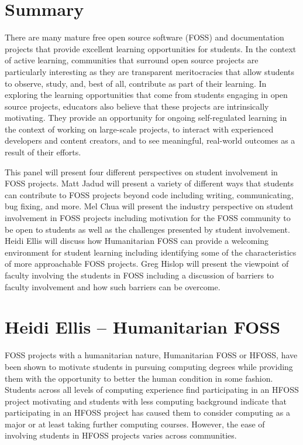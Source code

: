 \documentclass{sig-alt-release2}
\begin{document}

\section{Summary}
There are many mature free open source software (FOSS) and documentation projects that provide excellent learning opportunities for students.  In the context of active learning, communities that surround open source projects are particularly interesting as they are transparent meritocracies that allow students to observe, study, and, best of all, contribute as part of their learning.  In exploring the learning opportunities that come from students engaging in open source projects, educators also believe that these projects are intrinsically motivating. They provide an opportunity for ongoing self-regulated learning in the context of working on large-scale projects, to interact with experienced developers and content creators, and to see meaningful, real-world outcomes as a result of their efforts.

This panel will present four different perspectives on student involvement in FOSS projects. Matt Jadud will present a variety of different ways that students can contribute to FOSS projects beyond code including writing, communicating, bug fixing, and more. Mel Chua will present the industry perspective on student involvement in FOSS projects including motivation for the FOSS community to be open to students as well as the challenges presented by student involvement. Heidi Ellis will discuss how Humanitarian FOSS can provide a welcoming environment for student learning including identifying some of the characteristics of more approachable FOSS projects. Greg Hislop will present the viewpoint of faculty involving the students in FOSS including a discussion of barriers to faculty involvement and how such barriers can be overcome. 

\section{Heidi Ellis -- Humanitarian FOSS}
FOSS projects with a humanitarian nature, Humanitarian FOSS or HFOSS, have been shown to motivate students in pursuing computing degrees while providing them with the opportunity to better the human condition in some fashion. Students across all levels of computing experience find participating in an HFOSS project motivating and students with less computing background indicate that participating in an HFOSS project has caused them to consider computing as a major or at least taking further computing courses. However, the ease of involving students in HFOSS projects varies across communities. 
\end{document}
